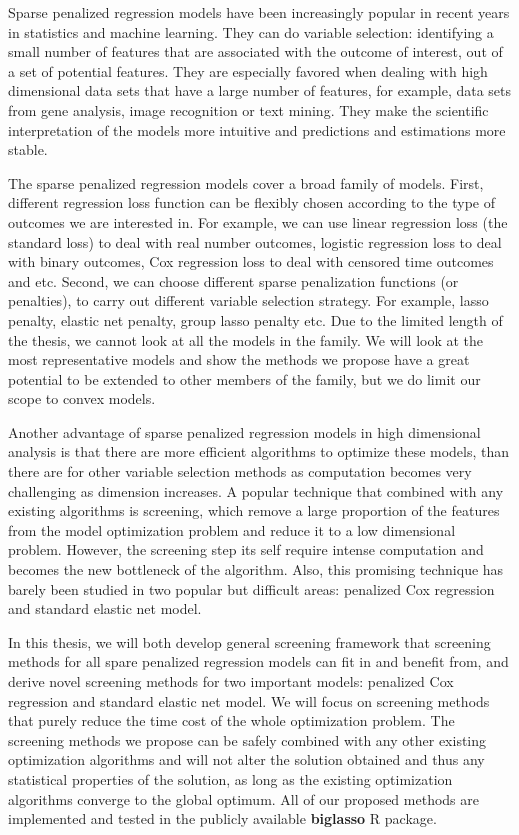 \label{intro}

Sparse penalized regression models have been increasingly popular in recent years in statistics and machine learning. They can do variable selection: identifying a small number of features that are associated with the outcome of interest, out of a set of potential features. They are especially favored when dealing with high dimensional data sets that have a large number of features, for example, data sets from gene analysis, image recognition or text mining. They make the scientific interpretation of the models more intuitive and predictions and estimations more stable.

The sparse penalized regression models cover a broad family of models. First, different regression loss function can be flexibly chosen according to the type of outcomes we are interested in. For example, we can use linear regression loss (the standard loss) to deal with real number outcomes, logistic regression loss to deal with binary outcomes, Cox regression loss to deal with censored time outcomes and etc. Second, we can choose different sparse penalization functions (or penalties), to carry out different variable selection strategy. For example, lasso penalty, elastic net penalty, group lasso penalty etc. Due to the limited length of the thesis, we cannot look at all the models in the family. We will look at the most representative models and show the methods we propose have a great potential to be extended to other members of the family, but we do limit our scope to convex models. 

Another advantage of sparse penalized regression models in high dimensional analysis is that there are more efficient algorithms to optimize these models, than there are for other variable selection methods as computation becomes very challenging as dimension increases. A popular technique that combined with any existing algorithms is screening, which remove a large proportion of the features from the model optimization problem and reduce it to a low dimensional problem.  However, the screening step its self require intense computation and becomes the new bottleneck of the algorithm. Also, this promising technique has barely been studied in two popular but difficult areas: penalized Cox regression and standard elastic net model.

In this thesis, we will both develop general screening framework that screening methods for all spare penalized regression models can fit in and benefit from, and derive novel screening methods for two important models: penalized Cox regression and standard elastic net model. We will focus on screening methods that purely reduce the time cost of the whole optimization problem. The screening methods we propose can be safely combined with any other existing optimization algorithms and will not alter the solution obtained and thus any statistical properties of the solution, as long as the existing optimization algorithms converge to the global optimum. All of our proposed methods are implemented and tested in the publicly available \textbf{biglasso} R package.

